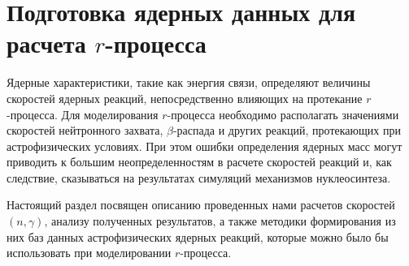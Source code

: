 \section{Подготовка ядерных данных для расчета $r$-процесса} 
\label{sec:reaclib}
Ядерные характеристики, такие как энергия связи, определяют величины скоростей ядерных реакций, непосредственно влияющих на протекание $r$-процесса. Для моделирования $r$-процесса необходимо располагать значениями скоростей нейтронного захвата, $\beta$-распада и других реакций, протекающих при астрофизических условиях. При этом ошибки определения ядерных масс могут приводить к большим неопределенностям в расчете скоростей реакций и, как следствие, сказываться на результатах симуляций механизмов нуклеосинтеза.

Настоящий раздел посвящен описанию проведенных нами расчетов скоростей $(n,\gamma)$, анализу полученных результатов, а также методики формирования из них баз данных астрофизических ядерных реакций, которые можно было бы использовать при моделировании $r$-процесса.




